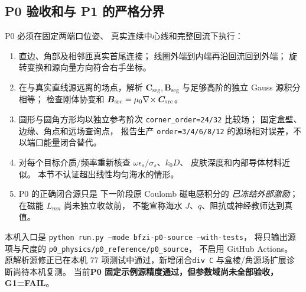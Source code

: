 \subsection{P0 验收和与 P1 的严格分界}
P0 必须在固定两端口位姿、
真实连续中心线和完整回流下执行：
\begin{enumerate}
\item 直边、角部及相邻匝真实首尾连接；
线圈外端到内端再沿回流回到外端；
旋转变换和源向量方向符合右手坐标。
\item 在与真实直线源远离的场点，解析
$\bm C_{\mathrm{seg}},\bm B_{\mathrm{seg}}$
与足够高阶的独立 Gauss 源积分相等；
检查刚体协变和
$\bm B_{\mathrm{src}}=\mu_0\nabla\!\times\bm C_{\mathrm{src}}$。
\item 圆形与圆角方形均以独立参考阶次
\texttt{corner\_order=24/32} 比较场；
固定盒壁、边缘、角点和远场查询点，
报告生产 \texttt{order=3/4/6/8/12}
的源场相对误差，不以端口能量闭合替代。
\item 对每个目标介质/频率重新核查
$\omega\epsilon_s/\sigma_s$、$k_0D$、
皮肤深度和内部导体材料近似。
本节不认证超出线性均匀海水的情形。
\item P0 的正确闭合源只是
下一阶段原 Coulomb 磁电感积分的
\emph{已冻结外部激励}；在磁能
$L_{mn}$ 尚未独立收敛前，
不能宣称海水 $J$、$q$、阻抗或神经教师达到真值。
\end{enumerate}
本机入口是
\texttt{python run.py --mode bfzi-p0-source --with-tests}，
将只输出源项与尺度的
\texttt{p0\_physics/p0\_reference/p0\_source}，
不启用 GitHub Actions。
原解析源修正已在本机 77 项测试中通过，新增闭合\texttt{div C}
与盒棱/角源场扩展诊断尚待本机复测。
当前\textbf{P0 固定示例源精度通过，但参数域尚未全部验收，G1=FAIL}。
